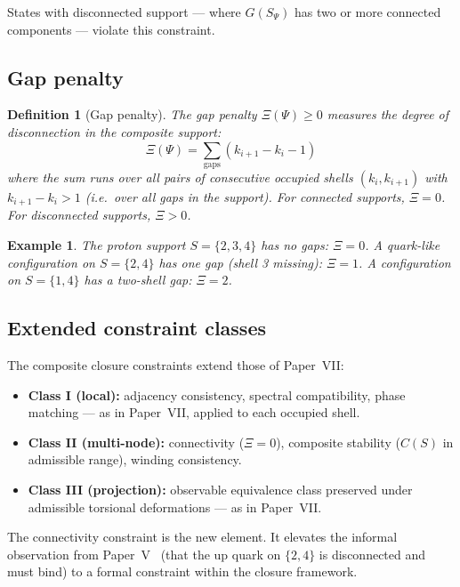 \documentclass[12pt]{article}
\newtheorem{definition}[theorem]{Definition}
\newtheorem{example}[theorem]{Example}
\begin{document}
States with disconnected support --- where $G(S_\Psi)$ has two or more connected components --- violate this constraint.

\subsection{Gap penalty}

\begin{definition}[Gap penalty]\label{def:gap}
The gap penalty $\Xi(\Psi) \geq 0$ measures the degree of disconnection in the composite support:
\begin{equation}\label{eq:gap}
    \Xi(\Psi) = \sum_{\text{gaps}} \left(k_{i+1} - k_i - 1\right)
\end{equation}
where the sum runs over all pairs of consecutive occupied shells $(k_i, k_{i+1})$ with $k_{i+1} - k_i > 1$ (i.e.\ over all gaps in the support). For connected supports, $\Xi = 0$. For disconnected supports, $\Xi > 0$.
\end{definition}

\begin{example}
The proton support $S = \{2,3,4\}$ has no gaps: $\Xi = 0$. A quark-like configuration on $S = \{2,4\}$ has one gap (shell 3 missing): $\Xi = 1$. A configuration on $S = \{1,4\}$ has a two-shell gap: $\Xi = 2$.
\end{example}

\subsection{Extended constraint classes}

The composite closure constraints extend those of Paper~VII:

\begin{itemize}
    \item \textbf{Class I (local):} adjacency consistency, spectral compatibility, phase matching --- as in Paper~VII, applied to each occupied shell.
    \item \textbf{Class II (multi-node):} connectivity ($\Xi = 0$), composite stability ($C(S)$ in admissible range), winding consistency.
    \item \textbf{Class III (projection):} observable equivalence class preserved under admissible torsional deformations --- as in Paper~VII.
\end{itemize}

The connectivity constraint is the new element. It elevates the informal observation from Paper~V~\citep{SmartV} (that the up quark on $\{2,4\}$ is disconnected and must bind) to a formal constraint within the closure framework.
\end{document}
